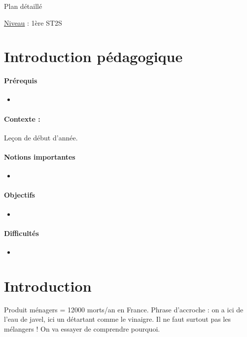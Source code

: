 \begin{reportBlock}{Plan détaillé}

\underline{Niveau} : 1ère ST2S \\

\section*{Introduction pédagogique}


\paragraph*{Prérequis}
\begin{itemize}
\item 
\end{itemize}

\paragraph*{Contexte :}
Leçon de début d'année.

\paragraph*{Notions importantes}

\begin{itemize}
\item 
\end{itemize}

\paragraph*{Objectifs}

\begin{itemize}
\item 
\end{itemize}

\paragraph*{Difficultés}

\begin{itemize}
\item 
\end{itemize}

\section*{Introduction }
Produit ménagers = 12000 morts/an en France. Phrase d'accroche : on a ici de l'eau de javel, ici un détartant comme le vinaigre. Il ne faut surtout pas les mélangers ! On va essayer de comprendre pourquoi.

\end{reportBlock}
